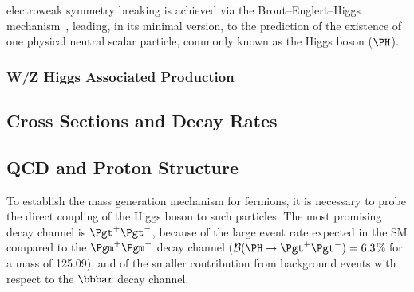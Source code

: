 electroweak symmetry breaking is achieved via the Brout--Englert--Higgs
mechanism~\cite{Englert:1964et,Higgs:1964ia,Higgs:1964pj,Guralnik:1964eu,Higgs:1966ev,Kibble:1967sv},
leading, in its minimal version, to the prediction of the existence of one physical neutral scalar particle,
commonly known as the Higgs boson ($\PH$).



\subsubsection{W/Z Higgs Associated Production}

\subsection{Cross Sections and Decay Rates}

\subsection{QCD and Proton Structure}



To establish the mass generation mechanism for fermions,
 it is necessary to probe the direct coupling of
the Higgs boson to such particles.
The most promising decay channel is $\Pgt^+\Pgt^-$,
because of the large event rate expected in the SM compared to the $\Pgm^+\Pgm^-$ decay channel ($\mathcal{B}(\PH\to\Pgt^+\Pgt^-)=6.3$\% for a mass of 125.09\GeV), and of the smaller contribution from background events
with respect to the $\bbbar$ decay channel.


